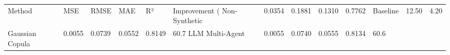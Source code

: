 \begin{tabular}{llllllll}
\toprule
Method & MSE & RMSE & MAE & R² & Improvement (%
\midrule
Non-Synthetic & 0.0354 & 0.1881 & 0.1310 & 0.7762 & Baseline & 12.50 & 4.20 \\
Gaussian Copula & 0.0055 & 0.0739 & 0.0552 & 0.8149 & 60.7%
LLM Multi-Agent & 0.0055 & 0.0740 & 0.0555 & 0.8134 & 60.6%
\bottomrule
\end{tabular}
